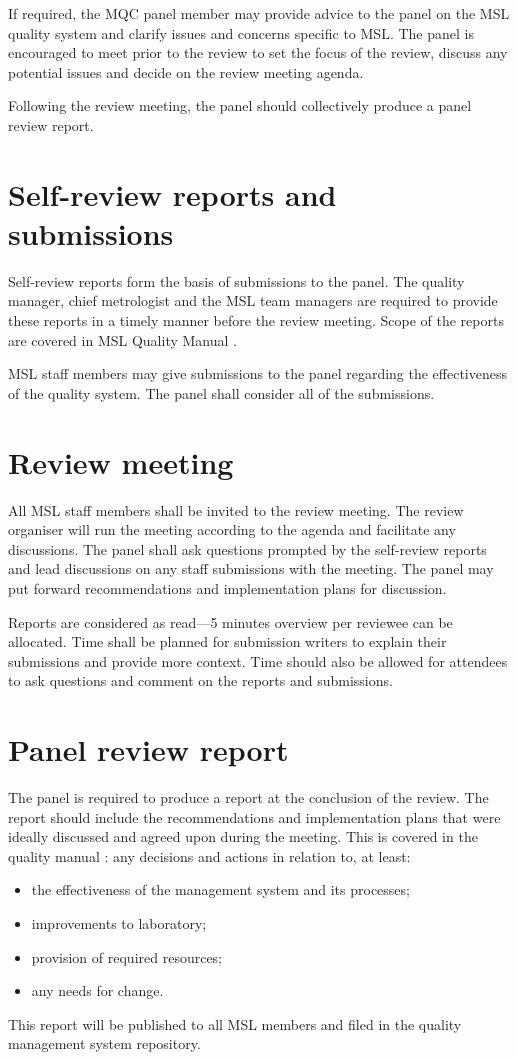 If required, the MQC panel member may provide advice to the panel on the MSL quality
system and clarify issues and concerns specific to MSL. The panel is encouraged to meet
prior to the review to set the focus of the review, discuss any potential issues and decide on
the review meeting agenda.

Following the review meeting, the panel should collectively produce a panel review report.

\section{Self-review reports and submissions}
Self-review reports form the basis of submissions to the panel. The quality manager, chief
metrologist and the MSL team managers are required to provide these reports in a timely
manner before the review meeting. Scope of the reports are covered in MSL Quality Manual
\cite[\S\ref*{QM-ss:management_review}]{MSL_Quality_Manual}.

MSL staff members may give submissions to the panel regarding the effectiveness of the
quality system. The panel shall consider all of the submissions.

\section{Review meeting}
All MSL staff members shall be invited to the review meeting. The review organiser will run
the meeting according to the agenda and facilitate any discussions. The panel shall ask
questions prompted by the self-review reports and lead discussions on any staff submissions with the meeting. The panel may put forward recommendations and implementation
plans for discussion.

Reports are considered as read---5 minutes overview per reviewee can be allocated. Time
shall be planned for submission writers to explain their submissions and provide more context. Time should also be allowed for attendees to ask questions and comment on the
reports and submissions.

\section{Panel review report}
The panel is required to produce a report at the conclusion of the review. The report should
include the recommendations and implementation plans that were ideally discussed and
agreed upon during the meeting. This is covered in the quality manual \cite[\S\ref*{QM-ss:management_review}]{MSL_Quality_Manual}: any decisions and actions in relation to, at least: 
\begin{itemize}
\item  the effectiveness of the management system and its processes; 
\item improvements to laboratory; 
\item provision of required resources; 
\item any needs for change.
\end{itemize} 
This report will be published to all MSL members and filed in the quality management system
repository.